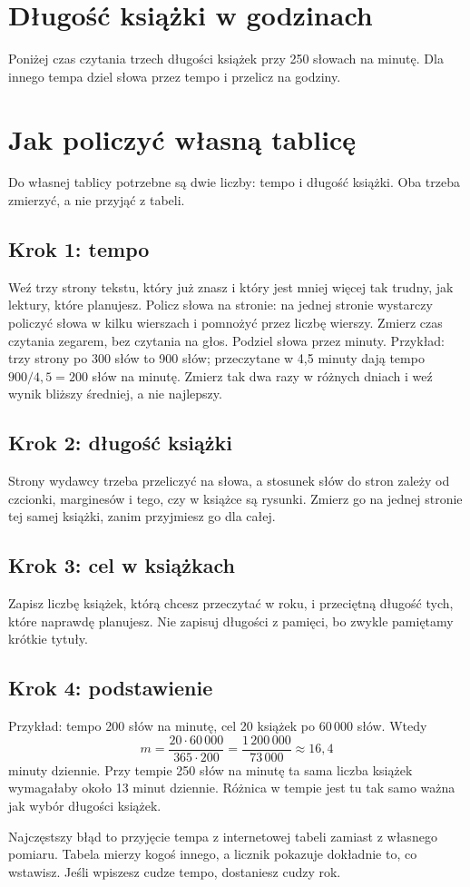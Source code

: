 
\section{Długość książki w godzinach}
Poniżej czas czytania trzech długości książek przy 250 słowach na minutę. Dla innego tempa
dziel słowa przez tempo i przelicz na godziny.


\section{Jak policzyć własną tablicę}
Do własnej tablicy potrzebne są dwie liczby: tempo i długość książki. Oba trzeba zmierzyć, a nie
przyjąć z tabeli.

\subsection*{Krok 1: tempo}
Weź trzy strony tekstu, który już znasz i który jest mniej więcej tak trudny, jak lektury, które
planujesz. Policz słowa na stronie: na jednej stronie wystarczy policzyć słowa w kilku wierszach
i pomnożyć przez liczbę wierszy. Zmierz czas czytania zegarem, bez czytania na głos. Podziel
słowa przez minuty. Przykład: trzy strony po 300 słów to 900 słów; przeczytane w 4,5 minuty
dają tempo $900 / 4{,}5 = 200$ słów na minutę. Zmierz tak dwa razy w różnych dniach i weź wynik
bliższy średniej, a nie najlepszy.

\subsection*{Krok 2: długość książki}
Strony wydawcy trzeba przeliczyć na słowa, a stosunek słów do stron zależy od czcionki, marginesów
i tego, czy w książce są rysunki. Zmierz go na jednej stronie tej samej książki, zanim przyjmiesz
go dla całej.

\subsection*{Krok 3: cel w książkach}
Zapisz liczbę książek, którą chcesz przeczytać w roku, i przeciętną długość tych, które naprawdę
planujesz. Nie zapisuj długości z pamięci, bo zwykle pamiętamy krótkie tytuły.

\subsection*{Krok 4: podstawienie}
Przykład: tempo 200 słów na minutę, cel 20 książek po 60\,000 słów. Wtedy
\[
m = \frac{20 \cdot 60\,000}{365 \cdot 200} = \frac{1\,200\,000}{73\,000} \approx 16{,}4
\]
minuty dziennie. Przy tempie 250 słów na minutę ta sama liczba książek wymagałaby około
13 minut dziennie. Różnica w tempie jest tu tak samo ważna jak wybór długości książek.

\begin{falle}
Najczęstszy błąd to przyjęcie tempa z internetowej tabeli zamiast z własnego pomiaru. Tabela
mierzy kogoś innego, a licznik pokazuje dokładnie to, co wstawisz. Jeśli wpiszesz cudze tempo,
dostaniesz cudzy rok.
\end{falle}
